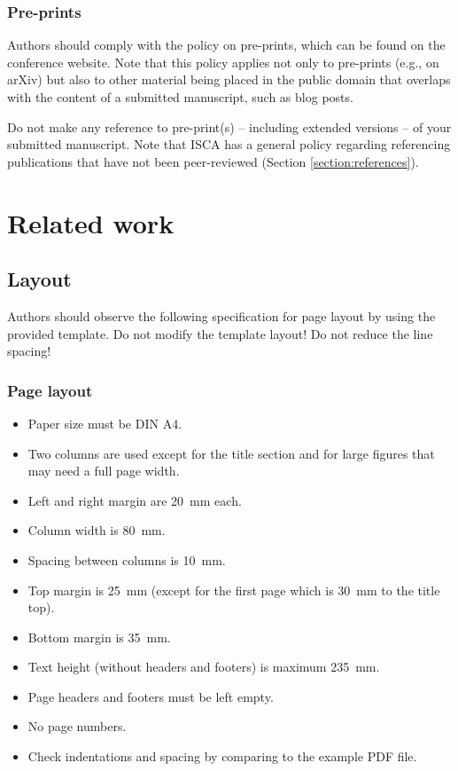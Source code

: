 \documentclass{INTERSPEECH2023}
\begin{document}
\subsubsection{Pre-prints}
\label{section:preprints}

Authors should comply with the policy on pre-prints, which can be found on the conference website. Note that this policy applies not only to pre-prints (e.g., on arXiv) but also to other material being placed in the public domain that overlaps with the content of a submitted manuscript, such as blog posts. 

Do not make any reference to pre-print(s) -- including extended versions -- of your submitted manuscript. Note that ISCA has a general policy regarding referencing publications that have not been peer-reviewed (Section \ref{section:references}). 

\section{Related work}

\subsection{Layout}

Authors should observe the following specification for page layout by using the provided template. Do not modify the template layout! Do not reduce the line spacing!

\subsubsection{Page layout}

\begin{itemize}
\item Paper size must be DIN A4.
\item Two columns are used except for the title section and for large figures that may need a full page width.
\item Left and right margin are \SI{20}{\milli\metre} each. 
\item Column width is \SI{80}{\milli\metre}. 
\item Spacing between columns is \SI{10}{\milli\metre}.
\item Top margin is \SI{25}{\milli\metre} (except for the first page which is \SI{30}{\milli\metre} to the title top).
\item Bottom margin is \SI{35}{\milli\metre}.
\item Text height (without headers and footers) is maximum \SI{235}{\milli\metre}.
\item Page headers and footers must be left empty.
\item No page numbers.
\item Check indentations and spacing by comparing to the example PDF file.
\end{itemize}
\end{document}
